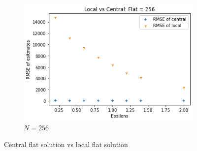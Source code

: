 \documentclass[11pt]{article}
\theoremstyle{definition}
\begin{document}
\begin{figure}[H]
\begin{subfigure}{.3\textwidth}
  \includegraphics[width=\linewidth]{figures/cen_vs_loc/flat/flat_N=256.png}
  \caption{$N=256$}
  \label{fig:cen_vs1024}
\end{subfigure}
\caption{Central flat solution vs local flat solution}
\label{fig:chh_hh_flat}
\end{figure}
\end{document}
